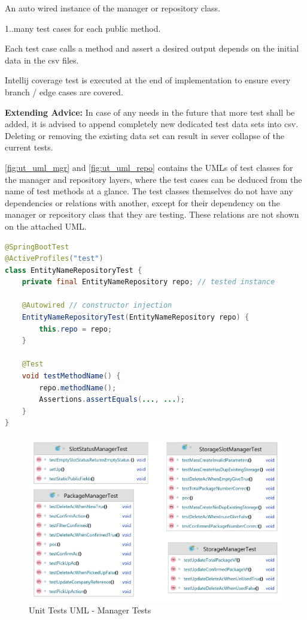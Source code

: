 \begin{compactenum}
    \item An auto wired instance of the manager or repository class.
    \item 1..many test cases for each public method.
    \item Each test case calls a method and assert a desired output depends on the initial data in the csv files.
    \item Intellij coverage test is executed at the end of implementation to ensure every branch / edge cases are covered.
\end{compactenum}

\bigskip
\textbf{Extending Advice:} In case of any needs in the future that more test shall be added, it is advised to append completely new dedicated test data sets into csv. Deleting or removing the existing data set can result in sever collapse of the current tests.

\autoref{fig:ut_uml_mgr} and \autoref{fig:ut_uml_repo} contains the UMLs of test classes for the manager and repository layers, where the test cases can be deduced from the name of test methods at a glance. The test classes themselves do not have any dependencies or relations with another, except for their dependency on the manager or repository class that they are testing. These relations are not shown on the attached UML.

\begin{lstlisting}[language={java}]
@SpringBootTest
@ActiveProfiles("test")
class EntityNameRepositoryTest {
    private final EntityNameRepository repo; // tested instance
    
    @Autowired // constructor injection
    EntityNameRepositoryTest(EntityNameRepository repo) {
        this.repo = repo; 
    }

    @Test
    void testMethodName() {
        repo.methodName();
        Assertions.assertEquals(..., ...);
    }
}
\end{lstlisting}

\begin{figure}[H]
    \centering
    \includegraphics[width=1\linewidth]{images/test/manager_tests.png}
    \caption{Unit Tests UML - Manager Tests}
    \label{fig:ut_uml_mgr}
\end{figure}

